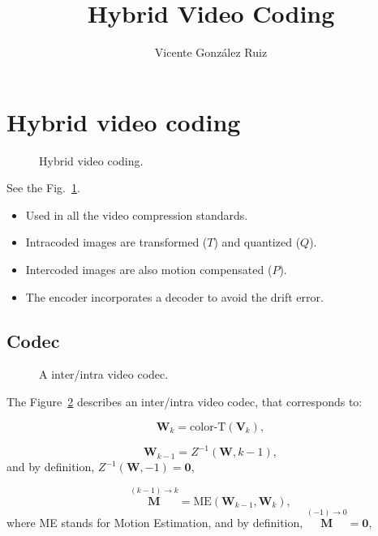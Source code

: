 \title{Hybrid Video Coding}
\author{Vicente González Ruiz}
\maketitle
\tableofcontents

\section{Hybrid video coding}

\begin{figure}
  \caption{Hybrid video coding.}
  \label{fig:hybrid_coding}
\end{figure}

See the Fig.~\ref{fig:hybrid_coding}.

\begin{itemize}
\tightlist
\item
  Used in all the video compression standards.
\item
  Intracoded images are transformed ($T$) and quantized ($Q$).
\item
  Intercoded images are also motion compensated ($P$).
\item
  The encoder incorporates a decoder to avoid the drift error.
\end{itemize}


\subsection{Codec}
\begin{figure}
  \centering
  \caption{A inter/intra video codec.}
\label{fig:IPP_codec}
\end{figure}

The Figure~\ref{fig:IPP_codec} describes an inter/intra video codec,
that corresponds to:

\begin{equation}
  {\mathbf W}_k = \text{color-T}({\mathbf V}_k),
  \tag{a}
\end{equation}

\begin{equation}
   {\mathbf W}_{k-1} = Z^{-1}({\mathbf W}, k-1),
  \tag{b}
\end{equation}
and by definition, $Z^{-1}({\mathbf W}, -1) = {\mathbf 0}$,

\begin{equation}
  \overset{(k-1)\rightarrow k}{\mathbf M} = \text{ME}({\mathbf W}_{k-1}, {\mathbf W}_k),
  \tag{c}
\end{equation}
where ME stands for Motion Estimation, and by definition,
$\overset{(-1)\rightarrow 0}{{\mathbf M}} = {\mathbf 0}$,

